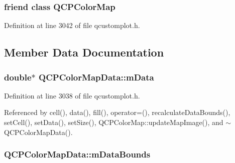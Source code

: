 \subsubsection[{Q\+C\+P\+Color\+Map}]{\setlength{\rightskip}{0pt plus 5cm}friend class {\bf Q\+C\+P\+Color\+Map}\hspace{0.3cm}{\ttfamily [friend]}}\label{class_q_c_p_color_map_data_afa9d9eab63af3e6f20f882c8d7cc9f20}


Definition at line 3042 of file qcustomplot.\+h.



\subsection{Member Data Documentation}
\hypertarget{class_q_c_p_color_map_data_ac1682862022f575191351c9825187d39}{}
\subsubsection[{m\+Data}]{\setlength{\rightskip}{0pt plus 5cm}double$\ast$ Q\+C\+P\+Color\+Map\+Data\+::m\+Data\hspace{0.3cm}{\ttfamily [protected]}}\label{class_q_c_p_color_map_data_ac1682862022f575191351c9825187d39}


Definition at line 3038 of file qcustomplot.\+h.



Referenced by cell(), data(), fill(), operator=(), recalculate\+Data\+Bounds(), set\+Cell(), set\+Data(), set\+Size(), Q\+C\+P\+Color\+Map\+::update\+Map\+Image(), and $\sim$\+Q\+C\+P\+Color\+Map\+Data().

\hypertarget{class_q_c_p_color_map_data_a1798b3dcc0a27091d196bfd156dcb3f2}{}
\subsubsection[{m\+Data\+Bounds}]{ Q\+C\+P\+Color\+Map\+Data\+::m\+Data\+Bounds\hspace{0.3cm}{\ttfamily [protected]}}\label{class_q_c_p_color_map_data_a1798b3dcc0a27091d196bfd156dcb3f2}


